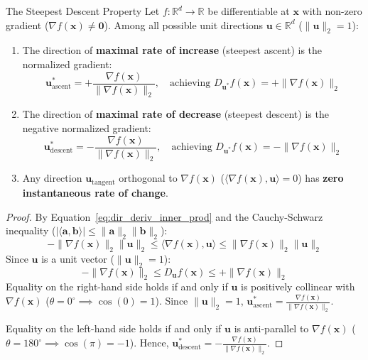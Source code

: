 \begin{theorembox}{The Steepest Descent Property}
Let $f: \mathbb{R}^d \to \mathbb{R}$ be differentiable at $\mathbf{x}$ with non-zero gradient ($\nabla f(\mathbf{x}) \ne \mathbf{0}$). Among all possible unit directions $\mathbf{u} \in \mathbb{R}^d$ ($\|\mathbf{u}\|_2 = 1$):
\begin{enumerate}
    \item The direction of \textbf{maximal rate of increase} (steepest ascent) is the normalized gradient:
    \begin{equation}
    \mathbf{u}^*_{\text{ascent}} = +\frac{\nabla f(\mathbf{x})}{\|\nabla f(\mathbf{x})\|_2}, \quad \text{achieving } D_{\mathbf{u}^*} f(\mathbf{x}) = +\|\nabla f(\mathbf{x})\|_2
    \end{equation}
    \item The direction of \textbf{maximal rate of decrease} (steepest descent) is the negative normalized gradient:
    \begin{equation}
    \mathbf{u}^*_{\text{descent}} = -\frac{\nabla f(\mathbf{x})}{\|\nabla f(\mathbf{x})\|_2}, \quad \text{achieving } D_{\mathbf{u}^*} f(\mathbf{x}) = -\|\nabla f(\mathbf{x})\|_2
    \end{equation}
    \item Any direction $\mathbf{u}_{\text{tangent}}$ orthogonal to $\nabla f(\mathbf{x})$ ($\langle \nabla f(\mathbf{x}), \mathbf{u} \rangle = 0$) has \textbf{zero instantaneous rate of change}.
\end{enumerate}
\end{theorembox}

\begin{proof}
By Equation~\eqref{eq:dir_deriv_inner_prod} and the Cauchy-Schwarz inequality ($|\langle \mathbf{a}, \mathbf{b} \rangle| \le \|\mathbf{a}\|_2 \|\mathbf{b}\|_2$):
\begin{equation}
-\|\nabla f(\mathbf{x})\|_2 \|\mathbf{u}\|_2 \le \langle \nabla f(\mathbf{x}), \mathbf{u} \rangle \le \|\nabla f(\mathbf{x})\|_2 \|\mathbf{u}\|_2
\end{equation}
Since $\mathbf{u}$ is a unit vector ($\|\mathbf{u}\|_2 = 1$):
\begin{equation}
-\|\nabla f(\mathbf{x})\|_2 \le D_{\mathbf{u}} f(\mathbf{x}) \le +\|\nabla f(\mathbf{x})\|_2
\end{equation}
Equality on the right-hand side holds if and only if $\mathbf{u}$ is positively collinear with $\nabla f(\mathbf{x})$ ($\theta = 0^\circ \implies \cos(0) = 1$). Since $\|\mathbf{u}\|_2 = 1$, $\mathbf{u}^*_{\text{ascent}} = \frac{\nabla f(\mathbf{x})}{\|\nabla f(\mathbf{x})\|_2}$.

Equality on the left-hand side holds if and only if $\mathbf{u}$ is anti-parallel to $\nabla f(\mathbf{x})$ ($\theta = 180^\circ \implies \cos(\pi) = -1$). Hence, $\mathbf{u}^*_{\text{descent}} = -\frac{\nabla f(\mathbf{x})}{\|\nabla f(\mathbf{x})\|_2}$.
\end{proof}

